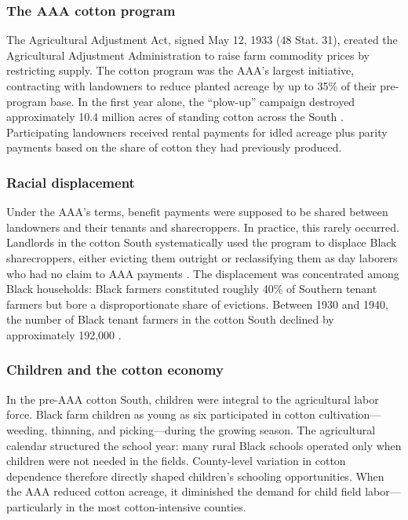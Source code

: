 \documentclass[12pt]{article}
\begin{document}
\subsubsection*{The AAA cotton program} The Agricultural Adjustment Act, signed May 12, 1933 (48 Stat. 31), created the Agricultural Adjustment Administration to raise farm commodity prices by restricting supply. The cotton program was the AAA's largest initiative, contracting with landowners to reduce planted acreage by up to 35\% of their pre-program base. In the first year alone, the ``plow-up'' campaign destroyed approximately 10.4 million acres of standing cotton across the South \citep{nourse1935three}. Participating landowners received rental payments for idled acreage plus parity payments based on the share of cotton they had previously produced.

\subsubsection*{Racial displacement} Under the AAA's terms, benefit payments were supposed to be shared between landowners and their tenants and sharecroppers. In practice, this rarely occurred. Landlords in the cotton South systematically used the program to displace Black sharecroppers, either evicting them outright or reclassifying them as day laborers who had no claim to AAA payments \citep{grubbs1971cry, mertz1978new}. The displacement was concentrated among Black households: Black farmers constituted roughly 40\% of Southern tenant farmers but bore a disproportionate share of evictions. Between 1930 and 1940, the number of Black tenant farmers in the cotton South declined by approximately 192,000 \citep{wright1986old}.

\subsubsection*{Children and the cotton economy} In the pre-AAA cotton South, children were integral to the agricultural labor force. Black farm children as young as six participated in cotton cultivation---weeding, thinning, and picking---during the growing season. The agricultural calendar structured the school year: many rural Black schools operated only when children were not needed in the fields. County-level variation in cotton dependence therefore directly shaped children's schooling opportunities. When the AAA reduced cotton acreage, it diminished the demand for child field labor---particularly in the most cotton-intensive counties.
\end{document}
